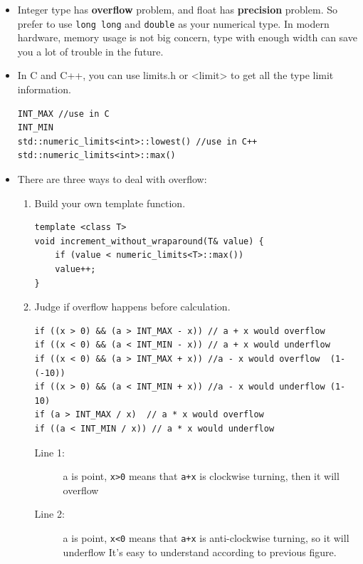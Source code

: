 \documentclass[a4paper,11pt,twoside]{book}
\begin{document}
\begin{itemize}

	
	\item Integer type has \textbf{overflow} problem, and float has \textbf{precision} problem. So prefer to use \texttt{long long} and \texttt{double} as your numerical type. In modern hardware, memory usage is not big concern, type with enough width can save you a lot of trouble in the future. 
	
	\item In C and C++, you can use limits.h or <limit> to get all the type limit information.
	
\begin{lstlisting}[numbers=none]
INT_MAX //use in C
INT_MIN
std::numeric_limits<int>::lowest() //use in C++
std::numeric_limits<int>::max()
\end{lstlisting}
	
	\item There are three ways to deal with overflow:
	\begin{enumerate}
		\item Build your own template function.
\begin{lstlisting}[numbers=none]
template <class T>
void increment_without_wraparound(T& value) {
	if (value < numeric_limits<T>::max())
	value++;
}
\end{lstlisting}
		
		\item  Judge if overflow happens before calculation.
		
\begin{lstlisting}
if ((x > 0) && (a > INT_MAX - x)) // a + x would overflow 
if ((x < 0) && (a < INT_MIN - x)) // a + x would underflow
if ((x < 0) && (a > INT_MAX + x)) //a - x would overflow  (1-(-10))
if ((x > 0) && (a < INT_MIN + x)) //a - x would underflow (1-10)
if (a > INT_MAX / x)  // a * x would overflow 
if ((a < INT_MIN / x)) // a * x would underflow 
\end{lstlisting}
		\begin{description}
			\item[Line 1:] a is point, \texttt{x>0} means that \texttt{a+x} is clockwise turning, then it will overflow
			\item[Line 2:] a is point, \texttt{x<0} means that \texttt{a+x} is anti-clockwise turning,  so it will underflow It's easy to understand according to previous figure.
		\end{description}
		

\end{enumerate}
\end{itemize}
\end{document}
